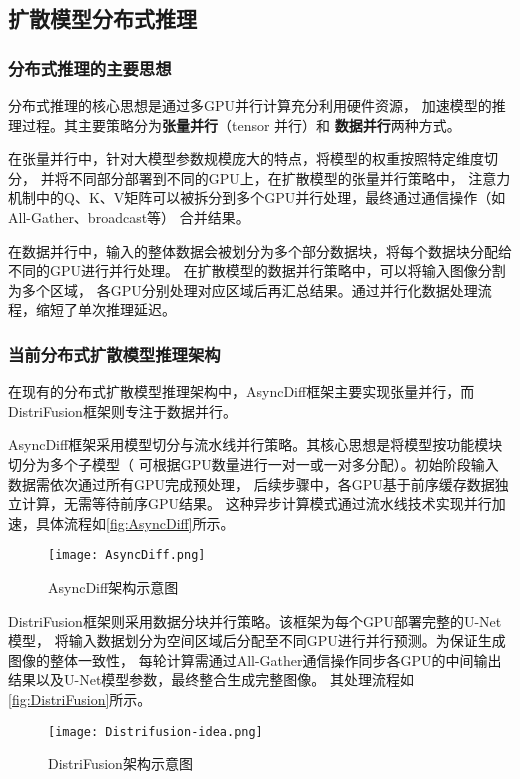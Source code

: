 \subsection{扩散模型分布式推理}
\subsubsection{分布式推理的主要思想}
\par
分布式推理的核心思想是通过多GPU并行计算充分利用硬件资源，
加速模型的推理过程\cite{Shoeybi2019MegatronLMTM}。其主要策略分为{\bfseries 张量并行}（tensor 并行）和
{\bfseries 数据并行}两种方式\cite{Megatron-LM}。
\par
在张量并行中，针对大模型参数规模庞大的特点，将模型的权重按照特定维度切分，
并将不同部分部署到不同的GPU上，在扩散模型的张量并行策略中\cite{Megatron-LM}，
注意力机制中的Q、K、V矩阵可以被拆分到多个GPU并行处理，最终通过通信操作（如All-Gather、broadcast等）
合并结果。
\par
在数据并行中，输入的整体数据会被划分为多个部分数据块，将每个数据块分配给不同的GPU进行并行处理。
在扩散模型的数据并行策略中，可以将输入图像分割为多个区域，
各GPU分别处理对应区域后再汇总结果。通过并行化数据处理流程，缩短了单次推理延迟。
\subsubsection{当前分布式扩散模型推理架构}
在现有的分布式扩散模型推理架构中，AsyncDiff框架主要实现张量并行，而DistriFusion框架则专注于数据并行。

\par
AsyncDiff框架采用模型切分与流水线并行策略。其核心思想是将模型按功能模块切分为多个子模型（
可根据GPU数量进行一对一或一对多分配）\cite{Chen2024AsyncDiffPD}。初始阶段输入数据需依次通过所有GPU完成预处理，
后续步骤中，各GPU基于前序缓存数据独立计算，无需等待前序GPU结果\cite{Ma2023DeepCacheAD}。
这种异步计算模式通过流水线技术实现并行加速，具体流程如\autoref{fig:AsyncDiff}所示。
\begin{figure}[ht]
    \centering
    \texttt{[image: AsyncDiff.png]}
    \caption{AsyncDiff架构示意图\cite{Chen2024AsyncDiffPD}}\label{fig:AsyncDiff}
\end{figure}

\par
DistriFusion框架则采用数据分块并行策略。该框架为每个GPU部署完整的U-Net模型，
将输入数据划分为空间区域后分配至不同GPU进行并行预测。为保证生成图像的整体一致性，
每轮计算需通过All-Gather通信操作同步各GPU的中间输出结果以及U-Net模型参数，最终整合生成完整图像\cite{Li2024DistriFusionDP}。
其处理流程如\autoref{fig:DistriFusion}所示。
\begin{figure}[ht]
    \centering
    \texttt{[image: Distrifusion-idea.png]}
    \caption{DistriFusion架构示意图\cite{Li2024DistriFusionDP}}\label{fig:DistriFusion}
\end{figure}

